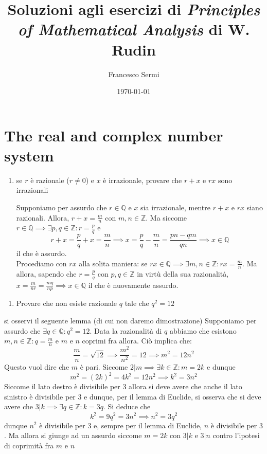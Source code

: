 \documentclass{report}
\title{Soluzioni agli esercizi di \emph{Principles of Mathematical Analysis} di W. Rudin}
\author{Francesco Sermi}
\date{\today}
\begin{document}
	\maketitle
	\tableofcontents
	\chapter{The real and complex number system}
	\begin{enumerate}[label=\protect\circled{\arabic*}]
		\item se $r$ è razionale ($r \neq 0$) e $x$ è irrazionale, provare che $r+x$ e $rx$ sono irrazionali
		\begin{mysolution}
			Supponiamo per assurdo che $r \in \mathbb{Q}$ e $x$ sia irrazionale, mentre $r+x$ e $rx$ siano razionali. Allora, $r+x = \frac{m}{n}$ con $m, n \in \mathbb{Z}$. Ma siccome $r \in \mathbb{Q} \implies \exists p, q \in \mathbb{Z}: r = \frac{p}{q}$ e
			$$
				r + x = \frac{p}{q} + x = \frac{m}{n} \implies x = \frac{p}{q} - \frac{m}{n} = \frac{pn - qm}{qn} \implies x \in \mathbb{Q}
			$$ 
			il che è assurdo. \\
			Procediamo con $rx$ alla solita maniera: se $rx \in \mathbb{Q} \implies \exists m, n \in \mathbb{Z}: rx = \frac{m}{n}$.  Ma allora, sapendo che $r = \frac{p}{q}$ con $p, q \in \mathbb{Z}$ in virtù della sua razionalità, $x = \frac{m}{nr} = \frac{mq}{np} \implies x \in \mathbb{Q}$ il che è nuovamente assurdo.
		\end{mysolution}
\end{enumerate}
\begin{enumerate}[resume, label=\protect\circled{\arabic*}]
		\item Provare che non esiste razionale $q$ tale che $q^2 = 12$
\end{enumerate}
		\begin{mysolution}
			si osservi il seguente lemma (di cui non daremo dimostrazione)
		\noindent Supponiamo per assurdo che $\exists q \in \mathbb{Q} : q^2 = 12$. Data la razionalità di $q$ abbiamo che esistono $m, n \in \mathbb{Z}: q = \frac{m}{n}$ e $m$ e $n$ coprimi fra allora. Ciò implica che:
		$$
			\frac{m}{n} = \sqrt{12} \implies \frac{m^2}{n^2} = 12 \implies m^2 = 12n^2
		$$
		Questo vuol dire che $m$ è pari. Siccome $2 | m \implies \exists k \in \mathbb{Z} : m = 2k$ e dunque
		$$
		m^2 = (2k)^2 = 4k^2 = 12n^2 \implies k^2 = 3n^2
		$$
		Siccome il lato destro è divisibile per $3$ allora si deve avere che anche il lato sinistro è divisibile per $3$ e dunque, per il lemma di Euclide, si osserva che si deve avere che $3 | k \implies \exists q \in \mathbb{Z} : k = 3q$. Si deduce che
		$$
		k^2 = 9q^2 = 3n^2 \implies n^2 = 3q^2
		$$
		dunque $n^2$ è divisibile per $3$ e, sempre per il lemma di Euclide, $n$ è divisibile per $3$. Ma allora si giunge ad un assurdo siccome $m = 2k$ con $3 | k$ e $3 | n$ contro l'ipotesi di coprimità fra $m$ e $n$
		\end{mysolution}
\end{document}
